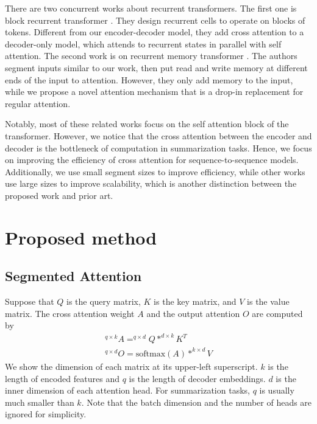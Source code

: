 \documentclass[11pt]{article}
\begin{document}
There are two concurrent works about recurrent transformers. The first one is block recurrent transformer \cite{Hutchins2022BlockRecurrentT}. They design recurrent cells to operate on blocks of tokens. Different from our encoder-decoder model, they add cross attention to a decoder-only model, which attends to recurrent states in parallel with self attention. The second work is on recurrent memory transformer \cite{bulatov2022recurrent}. The authors segment inputs similar to our work, then put read and write memory at different ends of the input to attention. However, they only add memory to the input, while we propose a novel attention mechanism that is a drop-in replacement for regular attention.


 Notably, most of these related works focus on the self attention block of the transformer. However, we notice that the cross attention between the encoder and decoder is the bottleneck of computation in summarization tasks. Hence, we focus on improving the efficiency of cross attention for sequence-to-sequence models. Additionally, we use small segment sizes to improve efficiency, while other works use large sizes to improve scalability, which is another distinction between the proposed work and prior art.










\section{Proposed method}

\subsection{Segmented Attention}
Suppose that $Q$ is the query matrix, $K$ is the key matrix, and $V$ is the value matrix. The cross attention weight $A$ and the output attention $O$ are computed by \begin{align}
^{q\times k}A = ^{q\times d} Q* ^{d\times k} K^T\\
^{q\times d}O =  \text{softmax}( A ) * ^{k\times d} V 
\end{align}
We show the dimension of each matrix at its upper-left superscript. $k$ is the length of encoded features and $q$ is the length of decoder embeddings. $d$ is the inner dimension of each attention head. For summarization tasks, $q$ is usually much smaller than $k$. Note that the  batch dimension and the number of heads are ignored for simplicity.
\end{document}
